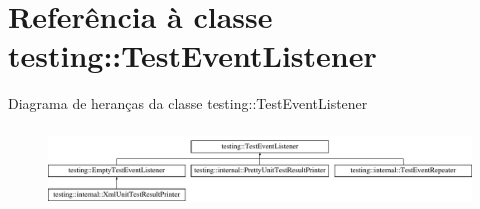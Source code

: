 \hypertarget{classtesting_1_1TestEventListener}{\section{Referência à classe testing\-:\-:Test\-Event\-Listener}
\label{classtesting_1_1TestEventListener}
}
Diagrama de heranças da classe testing\-:\-:Test\-Event\-Listener\begin{figure}[H]
\begin{center}
\leavevmode
\includegraphics[height=2.162162cm]{classtesting_1_1TestEventListener}
\end{center}
\end{figure}
